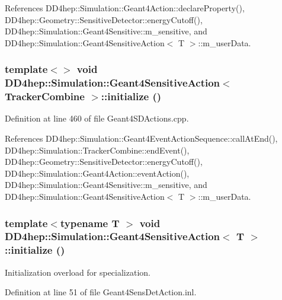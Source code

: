 References DD4hep::Simulation::Geant4Action::declareProperty(), DD4hep::Geometry::SensitiveDetector::energyCutoff(), DD4hep::Simulation::Geant4Sensitive::m\_\-sensitive, and DD4hep::Simulation::Geant4SensitiveAction$<$ T $>$::m\_\-userData.\hypertarget{class_d_d4hep_1_1_simulation_1_1_geant4_sensitive_action_a031c0b9cb9de513bc845012042fc7825}{
\subsubsection[{initialize}]{\setlength{\rightskip}{0pt plus 5cm}template$<$$>$ void {\bf DD4hep::Simulation::Geant4SensitiveAction}$<$ {\bf TrackerCombine} $>$::initialize ()}}
\label{class_d_d4hep_1_1_simulation_1_1_geant4_sensitive_action_a031c0b9cb9de513bc845012042fc7825}


Definition at line 460 of file Geant4SDActions.cpp.

References DD4hep::Simulation::Geant4EventActionSequence::callAtEnd(), DD4hep::Simulation::TrackerCombine::endEvent(), DD4hep::Geometry::SensitiveDetector::energyCutoff(), DD4hep::Simulation::Geant4Action::eventAction(), DD4hep::Simulation::Geant4Sensitive::m\_\-sensitive, and DD4hep::Simulation::Geant4SensitiveAction$<$ T $>$::m\_\-userData.\hypertarget{class_d_d4hep_1_1_simulation_1_1_geant4_sensitive_action_a6f4a254db9610da9e0a9b8c0a66a20da}{
\subsubsection[{initialize}]{\setlength{\rightskip}{0pt plus 5cm}template$<$typename T $>$ void {\bf DD4hep::Simulation::Geant4SensitiveAction}$<$ T $>$::initialize ()}}
\label{class_d_d4hep_1_1_simulation_1_1_geant4_sensitive_action_a6f4a254db9610da9e0a9b8c0a66a20da}


Initialization overload for specialization. 

Definition at line 51 of file Geant4SensDetAction.inl.

